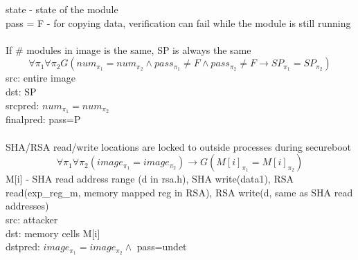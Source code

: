 \documentclass[10pt,openany]{article}
\begin{document}
state - state of the module\\
pass = F - for copying data, verification can fail while the module is still running\\\\
%
If \# modules in image is the same, SP is always the same
\[\forall \pi_1 \forall \pi_2G(num_{\pi_1}=num_{\pi_2}\land pass_{\pi_1}\neq F\land pass_{\pi_2}\neq F\rightarrow SP_{\pi_1}=SP_{\pi_2})\]
src: entire image\\
dst: SP\\
srcpred: $num_{\pi_1} = num_{\pi_2}$\\
finalpred: pass=P\\\\
%
SHA/RSA read/write locations are locked to outside processes during secureboot
\[\forall \pi_1 \forall \pi_2 (image_{\pi_1}=image_{\pi_2})\rightarrow G(M[i]_{\pi_1}=M[i]_{\pi_2})\]
M[i] - SHA read address range (d in rsa.h), SHA write(data1), RSA read(exp\_reg\_m, memory mapped reg in RSA), RSA write(d, same as SHA read addresses)\\
src: attacker\\
dst: memory cells M[i]\\
dstpred: $image_{\pi_1}=image_{\pi_2}\land$ pass=undet\\\\
%
\end{document}
